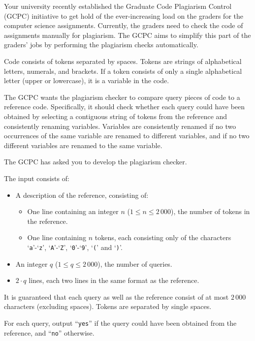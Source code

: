 
%
Your university recently established the Graduate Code Plagiarism Control (GCPC) initiative to get hold of the ever-increasing load on the graders for the computer science assignments.
Currently, the graders need to check the code of assignments manually for plagiarism.
The GCPC aims to simplify this part of the graders' jobs by performing the plagiarism checks automatically.

Code consists of tokens separated by spaces. Tokens are strings of alphabetical letters, numerals, and brackets. If a token consists of only a single alphabetical letter (upper or lowercase), it is a variable in the code.

The GCPC wants the plagiarism checker to compare query pieces of code to a reference code.
Specifically, it should check whether each query could have been obtained by selecting a contiguous
string of tokens from the reference and consistently renaming variables.
Variables are consistently renamed if no two occurrences of the same variable are renamed to different variables,
and if no two different variables are renamed to the same variable.

The GCPC has asked you to develop the plagiarism checker.

\begin{Input}
    The input consists of:
    \begin{itemize}
        \item A description of the reference, consisting of:
            \begin{itemize}
                \item One line containing an integer $n$ ($1\leq n \leq 2\,000$), the number of tokens in the reference.
                \item One line containing $n$ tokens, each consisting only of the characters `\texttt{a}'-`\texttt{z}', `\texttt{A}'-`\texttt{Z}', `\texttt{0}'-`\texttt{9}', `\texttt{(}' and `\texttt{)}'.
            \end{itemize}
        \item An integer $q$ ($1 \leq q \leq 2\,000$), the number of queries.
        \item $2\cdot q$ lines, each two lines in the same format as the reference.
    \end{itemize}
    It is guaranteed that each query as well as the reference consist of at most $2\,000$ characters (excluding spaces).
    Tokens are separated by single spaces.
\end{Input}

\begin{Output}
    For each query, output ``\texttt{yes}'' if the query could have been obtained from the reference, and ``\texttt{no}'' otherwise.
\end{Output}
